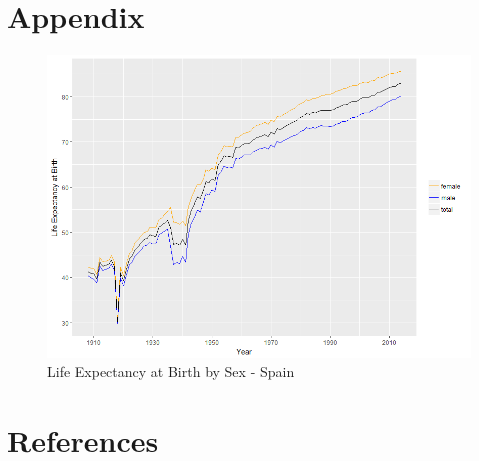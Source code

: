 \documentclass[a4paper,10pt,oneside,english]{article}
\begin{document}
\section*{\textsf{Appendix}}
\begin{figure} [H]
	\centering
	\includegraphics[width=0.7\linewidth]{LE_devel_ESP}
	\caption{Life Expectancy at Birth by Sex - Spain}
	\label{fig:ledevelesp}
\end{figure}

\newpage
\section*{\textsf{References}}

\footnotesize{}
\end{document}
